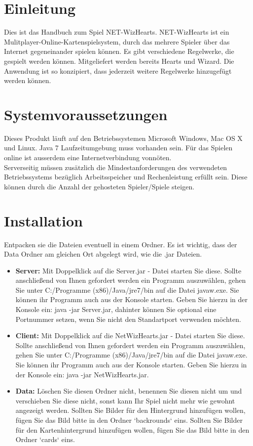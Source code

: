 \documentclass[titlepage,10pt,a4paper]{article}
\begin{document}
\newpage
 
\section{Einleitung}
Dies ist das Handbuch zum Spiel NET-WizHearts. NET-WizHearts ist ein Mulitplayer-Online-Kartenspielsystem, durch das mehrere Spieler über das Internet gegeneinander spielen können. Es gibt verschiedene Regelwerke, die gespielt werden können. Mitgeliefert werden bereits Hearts und Wizard. Die Anwendung ist so konzipiert, dass jederzeit weitere \gls{Regelwerk}e hinzugefügt werden können.

\section{Systemvoraussetzungen}
Dieses Produkt läuft auf den Betriebssystemen Microsoft Windows, Mac OS X und Linux. Java 7 Laufzeitumgebung muss vorhanden sein. Für das Spielen online ist ausserdem eine Internetverbindung vonnöten. \\
\gls{Server}seitig müssen zusätzlich die Mindestanforderungen des verwendeten Betriebssystems bezüglich Arbeitsspeicher und Rechenleistung erfüllt sein. Diese können durch die Anzahl der gehosteten Spieler/Spiele steigen.

\section{Installation}
Entpacken sie die Dateien eventuell in einem Ordner. Es ist wichtig, dass der Data Ordner am gleichen Ort abgelegt wird, wie die .jar Dateien.
\begin{itemize}
	\item \textbf{Server:} Mit Doppelklick auf die Server.jar - Datei starten Sie diese. Sollte anschließend von Ihnen gefordert werden ein Programm auszuwählen, gehen Sie unter C:/Programme (x86)/Java/jre7/bin auf die Datei javaw.exe.
	Sie können ihr Programm auch aus der Konsole starten. Geben Sie hierzu in der Konsole ein: java -jar Server.jar, dahinter können Sie optional eine Portnummer setzen, wenn Sie nicht den Standartport verwenden möchten.
	\item \textbf{Client:}  Mit Doppelklick auf die NetWizHearts.jar - Datei starten Sie diese. Sollte anschließend von Ihnen gefordert werden ein Programm auszuwählen, gehen Sie unter C:/Programme (x86)/Java/jre7/bin auf die Datei javaw.exe.
	Sie können ihr Programm auch aus der Konsole starten. Geben Sie hierzu in der Konsole ein: java -jar NetWizHearts.jar.
	\item \textbf{Data:} Löschen Sie diesen Ordner nicht, benennen Sie diesen nicht um und verschieben Sie diese nicht, sonst kann Ihr Spiel nicht mehr wie gewohnt angezeigt werden. Sollten Sie Bilder für den Hintergrund hinzufügen wollen, fügen Sie das Bild bitte in den Ordner `backrounds` eins. Sollten Sie Bilder für den Kartenhintergrund hinzufügen wollen, fügen Sie das Bild bitte in den Ordner `cards` eins.
\end{itemize}
\end{document}
